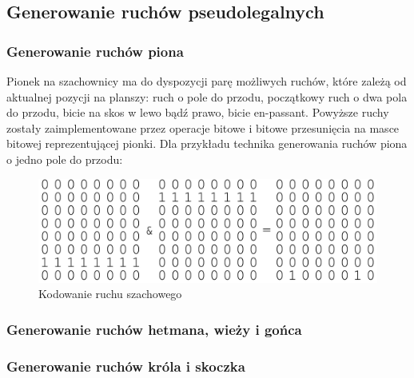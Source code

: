 \subsection{Generowanie ruchów pseudolegalnych}
\label{subsec:generowanie-ruchow-pseudolegalnych}

\subsubsection{Generowanie ruchów piona}

Pionek na szachownicy ma do dyspozycji parę możliwych ruchów, które zależą od aktualnej pozycji na planszy: ruch o pole do przodu, początkowy ruch o dwa pola do przodu, bicie na skos w lewo bądź prawo, bicie en-passant.
Powyższe ruchy zostały zaimplementowane przez operacje bitowe i bitowe przesunięcia na masce bitowej reprezentującej pionki.
Dla przykładu technika generowania ruchów piona o jedno pole do przodu:

\begin{figure}[ht]
    \centering
    \includegraphics[width=0.85\linewidth]{rozdzialy/rozdzial01/3_generowanie-ruchow/rysunki/bitboards-arithmetic}
    \caption{Kodowanie ruchu szachowego}
    \label{fig:bitboards-arithmetic}
\end{figure}


\subsubsection{Generowanie ruchów hetmana, wieży i gońca}

\subsubsection{Generowanie ruchów króla i skoczka}

